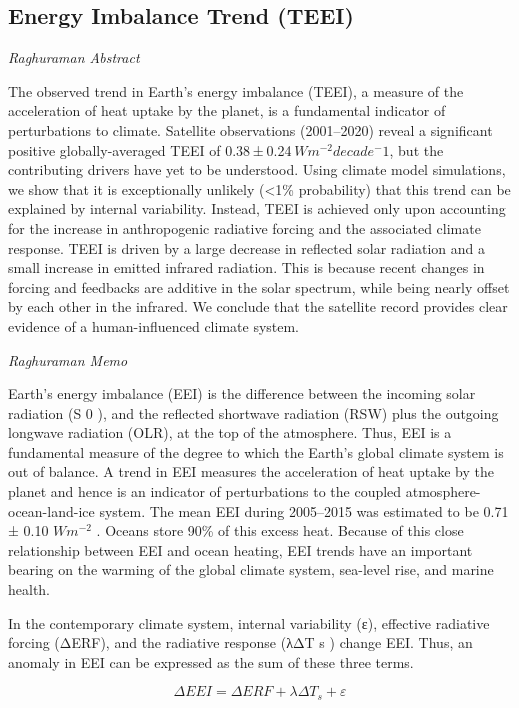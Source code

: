 \documentclass[
]{book}
\begin{document}
\hypertarget{energy-imbalance-trend-teei}{%
\subsection{Energy Imbalance Trend (TEEI)}\label{energy-imbalance-trend-teei}}

\emph{Raghuraman Abstract}

The observed trend in Earth's energy imbalance (TEEI), a measure of the acceleration of heat uptake by the planet, is a fundamental indicator of perturbations to climate. Satellite observations (2001--2020) reveal a significant positive globally-averaged TEEI of 0.38 ± 0.24 \(Wm^{-2} decade^-1\), but the contributing drivers have yet to be understood. Using climate model simulations, we show that it is exceptionally unlikely (\textless1\% probability) that this trend can be explained by internal variability. Instead, TEEI is achieved only upon accounting for the increase in anthropogenic radiative forcing and the associated climate response. TEEI is driven by a large decrease in reflected solar radiation and a small increase in emitted infrared radiation. This is because recent changes in forcing and feedbacks are additive in the solar spectrum, while being nearly offset by each other in the infrared. We conclude that the satellite record provides clear evidence of a human-influenced climate system.

\emph{Raghuraman Memo}

Earth's energy imbalance (EEI) is the difference between the
incoming solar radiation (S 0 ), and the reflected shortwave
radiation (RSW) plus the outgoing longwave radiation
(OLR), at the top of the atmosphere. Thus, EEI is a fundamental
measure of the degree to which the Earth's global climate
system is out of balance. A trend in EEI measures the acceleration
of heat uptake by the planet and hence is an indicator of perturbations
to the coupled atmosphere-ocean-land-ice system.
The mean EEI during 2005--2015 was estimated to be
0.71 ± 0.10 \(Wm^{-2}\) . Oceans store 90\% of this excess heat. Because
of this close relationship between EEI and ocean heating, EEI
trends have an important bearing on the warming of the global
climate system, sea-level rise, and marine health.

In the contemporary climate system, internal variability (ε),
effective radiative forcing (ΔERF), and the radiative response
(λΔT s ) change EEI. Thus, an anomaly in EEI can be
expressed as the sum of these three terms.

\[ΔEEI = ΔERF + λΔT_s+ ε\]
\end{document}

